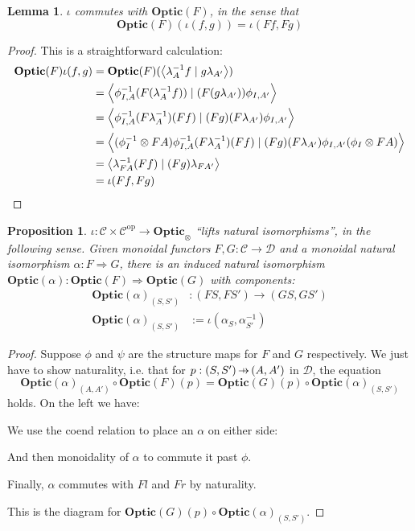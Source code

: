 \documentclass[11pt,letterpaper]{article}
\theoremstyle{plain}
\newtheorem{proposition}[theorem]{Proposition}
\newtheorem{lemma}[theorem]{Lemma}
\theoremstyle{definition}
\newcommand{\C}{\mathscr{C}}
\newcommand{\D}{\mathscr{D}}
\newcommand{\Optic}{\mathbf{Optic}}
\newcommand{\op}{\mathrm{op}}
\newcommand{\rep}[2]{{\ensuremath \left\langle #1 \mid #2 \right\rangle}}
\newcommand{\hto}{\ensuremath{\,\mathaccent\shortmid\rightarrow\,}}
\begin{document}
\begin{lemma}\label{lem:iota-commute-with-opticf}
$\iota$ commutes with $\Optic(F)$, in the sense that
\[ \Optic(F)(\iota(f, g)) = \iota(Ff, Fg) \]
\end{lemma}
\begin{proof}
This is a straightforward calculation:
  \begin{align*}
    \Optic(F)\iota(f, g)
    &= \Optic(F)(\rep{\lambda_A^{-1} f}{g \lambda_{A'}}) \\
    &= \rep{\phi^{-1}_{I,A} (F(\lambda_A^{-1} f))}{(F(g \lambda_{A'})) \phi_{I,A'}} \\
    &= \rep{\phi^{-1}_{I,A} (F\lambda_A^{-1}) (Ff)}{(Fg)(F \lambda_{A'}) \phi_{I,A'}} \\
    &= \rep{(\phi^{-1}_I \otimes FA) \phi^{-1}_{I,A} (F\lambda_A^{-1}) (Ff)}{(Fg)(F \lambda_{A'}) \phi_{I,A'} (\phi_I \otimes FA)} \\
    &= \rep{\lambda_{FA}^{-1} (Ff)}{(Fg)\lambda_{FA'}} \\
    &= \iota(Ff, Fg)
  \end{align*}
\end{proof}

\begin{proposition}\label{prop:iota-naturality}
$\iota : \C \times \C^\op \to \Optic_\otimes$ ``lifts natural isomorphisms'', in the following sense. Given monoidal functors $F, G : \C \to \D$ and a monoidal natural isomorphism $\alpha : F \Rightarrow G$, there is an induced natural isomorphism $\Optic(\alpha) : \Optic(F) \Rightarrow \Optic(G)$ with components:
\begin{align*}
\Optic(\alpha)_{(S, S')} &: (FS, FS') \to (GS, GS') \\
\Optic(\alpha)_{(S, S')} &:= \iota(\alpha_{S}, \alpha^{-1}_{S'})
\end{align*}
\end{proposition}
\begin{proof}
Suppose $\phi$ and $\psi$ are the structure maps for $F$ and $G$ respectively. We just have to show naturality, i.e. that for $p : (S, S') \hto (A, A')$ in $\D$, the equation \[\Optic(\alpha)_{(A, A')} \circ \Optic(F)(p) = \Optic(G)(p) \circ \Optic(\alpha)_{(S, S')}\] holds. On the left we have:
  \begin{center}
    
  \end{center}
  We use the coend relation to place an $\alpha$ on either side:
  \begin{center}
    
  \end{center}
  And then monoidality of $\alpha$ to commute it past $\phi$.
  \begin{center}
    
  \end{center}
  Finally, $\alpha$ commutes with $F l$ and $F r$ by naturality.
  \begin{center}
    
  \end{center}
  This is the diagram for $\Optic(G)(p) \circ \Optic(\alpha)_{(S, S')}$.
\end{proof}
\end{document}
